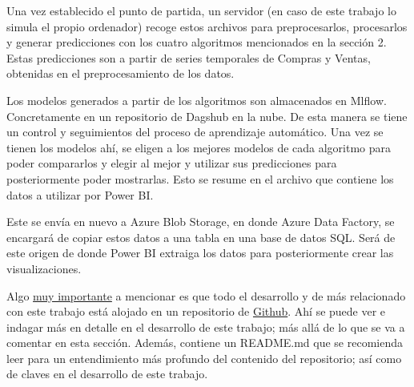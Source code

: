 Una vez establecido el punto de partida, un servidor (en caso de este trabajo lo simula el propio ordenador) recoge estos archivos  para preprocesarlos, procesarlos y  generar predicciones con los cuatro algoritmos mencionados en la sección 2. Estas predicciones son a partir de series temporales de Compras y Ventas, obtenidas en el preprocesamiento de los datos.


Los modelos generados a partir de los algoritmos son almacenados en Mlflow. Concretamente en un repositorio de Dagshub en la nube. De esta manera se tiene un control y seguimientos del proceso de aprendizaje automático. Una vez se tienen los modelos ahí, se eligen a los mejores modelos de cada algoritmo para poder compararlos y elegir al mejor y utilizar sus predicciones para posteriormente poder mostrarlas. Esto se resume en el archivo   que contiene los datos a utilizar por Power BI.

Este  se envía en nuevo a Azure Blob Storage, en donde Azure Data Factory, se encargará de copiar estos datos a una tabla en una base de datos SQL. Será de este origen de donde Power BI extraiga los datos para posteriormente crear las visualizaciones.

Algo \ul{muy importante} a mencionar es que  todo el desarrollo y de más relacionado con este trabajo está alojado en un repositorio de \href{https://github.com/JCOQUE/TFG-ingenieria.git}{Github}. Ahí se puede ver e indagar más en detalle en el desarrollo de este trabajo; más allá de lo que se va a comentar en esta sección. Además, contiene un README.md que se recomienda leer para un entendimiento más profundo del contenido del repositorio; así como de claves en el desarrollo de este trabajo.

